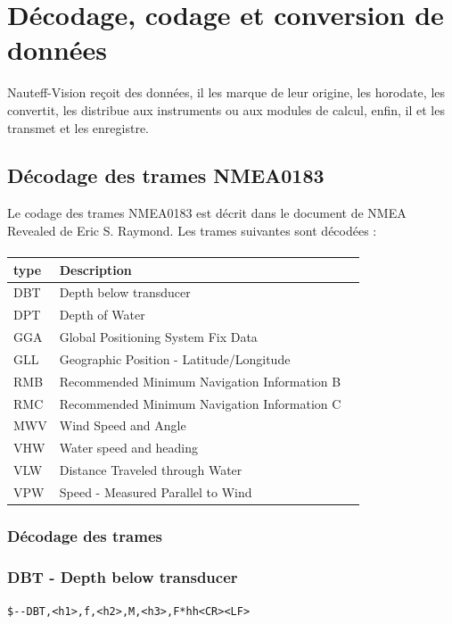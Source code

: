 \documentclass[a4paper,11pt]{report}
\begin{document}
\section{Décodage, codage et conversion de données}

Nauteff-Vision reçoit des données, il les marque de leur origine,
les horodate, les convertit, les distribue aux instruments ou aux modules de calcul, enfin, il et les transmet et les enregistre.

\subsection{Décodage des trames NMEA0183}
Le codage des trames NMEA0183 est décrit dans le document de NMEA Revealed de Eric S. Raymond.
Les trames suivantes sont décodées :
\paragraph{}
\begin{tabular}{|l|l|c|}
	\hline 
	type & Description &  \\ 
	\hline 
	DBT & Depth below transducer &  \\ 
	\hline 
	DPT & Depth of Water &  \\ 
	\hline 
	GGA& Global Positioning System Fix Data &  \\
	\hline 
	GLL& Geographic Position - Latitude/Longitude &  \\
	\hline 
	RMB& Recommended Minimum Navigation Information B &  \\
	\hline 
	RMC& Recommended Minimum Navigation Information C &  \\
	\hline 
	MWV& Wind Speed and Angle &  \\
	\hline 
	VHW & Water speed and heading &  \\
	\hline 
	VLW & Distance Traveled through Water &  \\ 
	\hline 
	VPW& Speed - Measured Parallel to Wind &  \\
	\hline 
\end{tabular}

\subsubsection{Décodage des trames}


\subsubsection{DBT - Depth below transducer}
\texttt{\${-}{-}DBT,<h1>,f,<h2>,M,<h3>,F*hh<CR><LF>}
\end{document}
